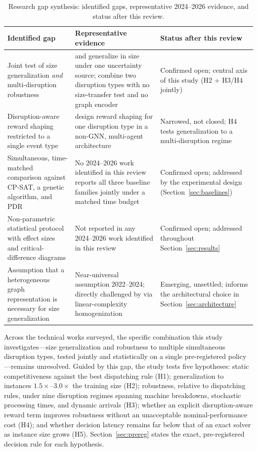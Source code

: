 \documentclass[11pt]{article}
\begin{document}
\begin{table}[htbp]
\centering
\caption{Research gap synthesis: identified gaps, representative 2024--2026 evidence, and status after this review.}
\label{tab:gap}
\small
\begin{tabular}{p{3.6cm}p{5.8cm}p{4.4cm}}
\toprule
\textbf{Identified gap} & \textbf{Representative evidence} & \textbf{Status after this review} \\
\midrule
Joint test of size generalization \emph{and} multi-disruption robustness &
\citet{smit2025spmdan} and \citet{infantes2024wheatley} generalize in size under one uncertainty source; \citet{lassoued2026} combine two disruption types with no size-transfer test and no graph encoder &
Confirmed open; central axis of this study (H2 + H3/H4 jointly) \\
\addlinespace
Disruption-aware reward shaping restricted to a single event type &
\citet{zhang2024rewardshaping} design reward shaping for one disruption type in a non-GNN, multi-agent architecture &
Narrowed, not closed; H4 tests generalization to a multi-disruption regime \\
\addlinespace
Simultaneous, time-matched comparison against CP-SAT, a genetic algorithm, and PDR &
No 2024--2026 work identified in this review reports all three baseline families jointly under a matched time budget &
Confirmed open; addressed by the experimental design (Section~\ref{sec:baselines}) \\
\addlinespace
Non-parametric statistical protocol with effect sizes and critical-difference diagrams &
Not reported in any 2024--2026 work identified in this review &
Confirmed open; addressed throughout Section~\ref{sec:results} \\
\addlinespace
Assumption that a heterogeneous graph representation is necessary for size generalization &
Near-universal assumption 2022--2024; directly challenged by \citet{hoss2026} via linear-complexity homogenization &
Emerging, unsettled; informs the architectural choice in Section~\ref{sec:architecture} \\
\bottomrule
\end{tabular}
\end{table}

Across the technical works surveyed, the specific combination this study investigates---size generalization and robustness to multiple simultaneous disruption types, tested jointly and statistically on a single pre-registered policy---remains unresolved. Guided by this gap, the study tests five hypotheses: static competitiveness against the best dispatching rule (H1); generalization to instances $1.5\times$--$3.0\times$ the training size (H2); robustness, relative to dispatching rules, under nine disruption regimes spanning machine breakdowns, stochastic processing times, and dynamic arrivals (H3); whether an explicit disruption-aware reward term improves robustness without an unacceptable nominal-performance cost (H4); and whether decision latency remains far below that of an exact solver as instance size grows (H5). Section~\ref{sec:prereg} states the exact, pre-registered decision rule for each hypothesis.
\end{document}
